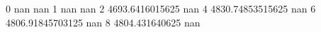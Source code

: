 0 nan nan
1 nan nan
2 4693.6416015625 nan
4 4830.74853515625 nan
6 4806.91845703125 nan
8 4804.431640625 nan
